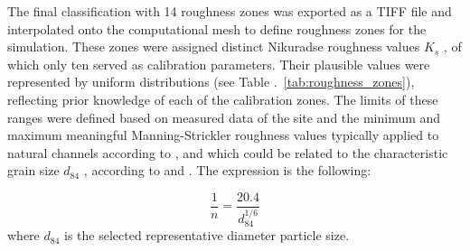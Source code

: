 \documentclass[draft,linenumbers,onecolumn]{agujournal2019} %
\begin{document}
The final classification with 14 roughness zones was exported as a TIFF file and interpolated onto the computational mesh to define roughness zones for the simulation. These zones were assigned distinct Nikuradse roughness values \( K_s \) , of which only ten served as calibration parameters. Their plausible values were represented by uniform distributions (see Table .~\ref{tab:roughness_zones}), reflecting prior knowledge of each of the calibration zones. The limits of these ranges were defined based on measured data of the site and the minimum and maximum meaningful Manning-Strickler roughness values typically applied to natural channels according to \cite{chow1959openchannel}, and which could be related to the characteristic grain size \(d_{84}\) , according to  and . The expression is the following: 

\begin{equation}
	\frac{1}{n} = \frac{20.4}{d_{84}^{1/6}}
	\label{eq:roughness}
\end{equation}
where \( d_{84} \) is the selected representative diameter particle size. 
\end{document}
